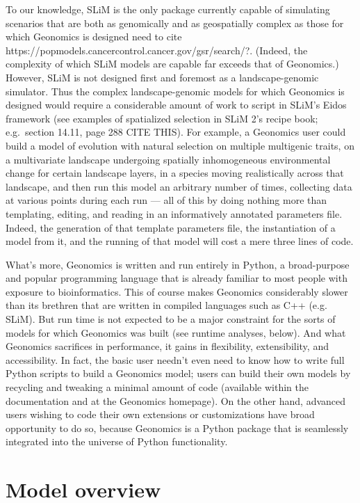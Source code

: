 ﻿\documentclass{article}
\begin{document}
To our knowledge, SLiM is the only package currently capable of simulating scenarios
that are both as genomically and as geospatially complex as those for which Geonomics is designed
{\large need to cite https://popmodels.cancercontrol.cancer.gov/gsr/search/?}.
(Indeed, the complexity of which SLiM models are capable far exceeds that of Geonomics.)
However, SLiM is not designed first and foremost as a landscape-genomic simulator.
Thus the complex landscape-genomic models for which Geonomics is designed would require
a considerable amount of work to script in SLiM's Eidos framework
(see examples of spatialized selection in SLiM 2's recipe book;
e.g.\ section 14.11, page 288 {\large CITE THIS}).
For example, a Geonomics user could build a model of evolution with natural selection
on multiple multigenic traits, on a multivariate landscape undergoing spatially inhomogeneous
environmental change for certain landscape layers, in a species moving realistically across that landscape,
and then run this model an arbitrary number of times, collecting data at various points during each
run --- all of this by doing nothing more than templating, editing,
and reading in an informatively annotated parameters file.
Indeed, the generation of that template parameters file, the instantiation of a model from it,
and the running of that model will cost a mere three lines of code.

What's more, Geonomics is written and run entirely in Python, a broad-purpose and popular
programming language that is already familiar to most people with exposure to bioinformatics.
This of course makes Geonomics considerably slower than its brethren that are
written in compiled languages such as C++ (e.g. SLiM). 
But run time is not expected to be a major constraint for the sorts of models
for which Geonomics was built (see runtime analyses, below). 
And what Geonomics sacrifices in performance, it gains in flexibility, extensibility, and accessibility.
In fact, the basic user needn't even need to know how to write full Python scripts to 
build a Geonomics model; users can build their own models by recycling and tweaking
a minimal amount of code (available within the documentation and at the Geonomics homepage).
On the other hand, advanced users wishing to code their own extensions or customizations
have broad opportunity to do so, because Geonomics is a Python package that is seamlessly
integrated into the universe of Python functionality.


\section{Model overview}
\end{document}
